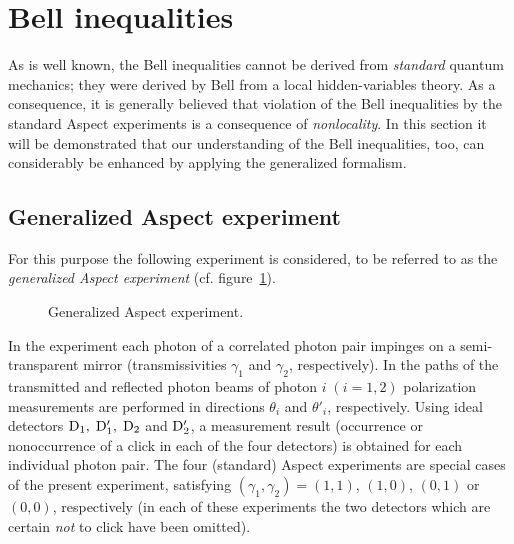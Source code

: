 \documentclass{ws-procs975x65}
\begin{document}
{\section{Bell inequalities}\label{sec3}
As is well known, the Bell inequalities cannot be derived from
\textit{standard} quantum mechanics; they were derived by
Bell\cite{Bell64} from a local hidden-variables theory. As a
consequence, it is generally believed that violation of the Bell
inequalities by the standard Aspect experiments\cite{Asp81,Asp82}
is a consequence of \textit{nonlocality}. In this section it will
be demonstrated that our understanding of the Bell inequalities,
too, can considerably be enhanced by applying the generalized
formalism\cite{dM2002}.

\subsection{Generalized Aspect
experiment}\label{sec3.1} For this purpose the following
experiment is considered, to be referred to as the
\textit{generalized Aspect experiment} (cf. figure~\ref{fig5}).
\begin{figure}
 \caption{Generalized Aspect experiment.}
  \label{fig5}
\end{figure}
 In the experiment each photon of a
correlated photon pair impinges on a semi-transparent mirror
(transmissivities $\gamma_1$ and $\gamma_2$, respectively). In the
paths of the transmitted and reflected photon beams of photon
$i\;(i=1,2)$ polarization measurements are performed in directions
$\theta_i$ and $\theta'_i$, respectively. Using ideal detectors
$\rm D_1,\;D'_1,\;D_2$ and $\rm D'_2$, a measurement result
(occurrence or nonoccurrence of a click in each of the four
detectors) is obtained for each individual photon pair. The four
(standard) Aspect experiments\cite{Asp81,Asp82} are special cases
of the present experiment, satisfying $(\gamma_1,
\gamma_2)=(1,1)$, $(1,0)$, $(0,1)$ or $(0,0)$, respectively (in
each of these experiments the two detectors which are certain
\textit{not} to click have been omitted).

}
\end{document}
